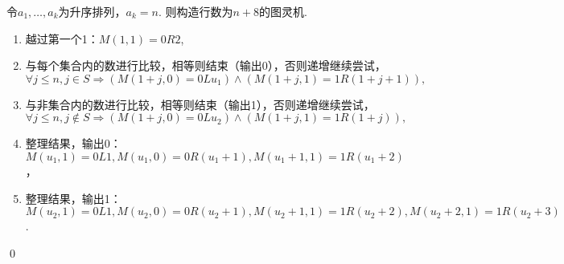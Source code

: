 \begin{pf} \rm \;
    令$a_1, \dots, a_k$为升序排列，$a_k = n$. 则构造行数为$n+8$的图灵机. 

    \begin{enumerate}
        \item 越过第一个1：$M(1, 1) = 0R2$, \\
        \item 与每个集合内的数进行比较，相等则结束（输出0），否则递增继续尝试，$ \forall j\le n, j\in S \Rightarrow (M(1+j, 0) = 0Lu_1) \wedge (M(1+j, 1) = 1R(1+j+1)), $ \\
        \item 与非集合内的数进行比较，相等则结束（输出1），否则递增继续尝试，$\forall j\le n, j\not\in S\Rightarrow (M(1+j, 0) = 0Lu_2) \wedge (M(1+j, 1) = 1R(1+j)), $\\
        \item 整理结果，输出0：$M(u_1, 1) = 0L1, M(u_1, 0) = 0R(u_1+1), M(u_1+1, 1) = 1R(u_1 + 2)$，\\
        \item 整理结果，输出1：$M(u_2, 1) = 0L1, M(u_2, 0) = 0R(u_2+1), M(u_2+1, 1) = 1R(u_2 + 2), M(u_2+2, 1)=1R(u_2+3)$.\\
    \end{enumerate}

    \qed
\end{pf}